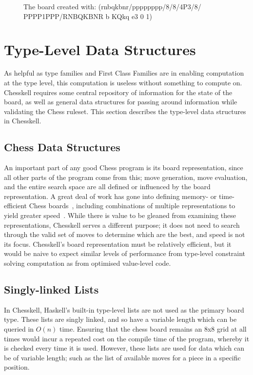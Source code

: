 \begin{figure}[h]
    \centering
    \showboard
    \caption{The board created with: (rnbqkbnr/pppppppp/8/8/4P3/8/\\PPPP1PPP/RNBQKBNR b KQkq e3 0 1)}
    \label{fenexample}
\end{figure}

\section{Type-Level Data Structures}

As helpful as type families and First Class Families are in enabling computation at the type level, this computation is useless without something to compute on. Chesskell requires some central repository of information for the state of the board, as well as general data structures for passing around information while validating the Chess ruleset. This section describes the type-level data structures in Chesskell.

\subsection{Chess Data Structures}

An important part of any good Chess program is its board representation, since all other parts of the program come from this; move generation, move evaluation, and the entire search space are all defined or influenced by the board representation. A great deal of work has gone into defining memory- or time-efficient Chess boards~\cite{bitboard,searchtables}, including combinations of multiple representations to yield greater speed~\cite{bitandccr}. While there is value to be gleaned from examining these representations, Chesskell serves a different purpose; it does not need to search through the valid set of moves to determine which are the best, and speed is not its focus. Chesskell's board representation must be relatively efficient, but it would be naive to expect similar levels of performance from type-level constraint solving computation as from optimised value-level code.

\subsection{Singly-linked Lists}

In Chesskell, Haskell's built-in type-level lists are not used as the primary board type. These lists are singly linked, and so have a variable length which can be queried in $O(n)$ time. Ensuring that the chess board remains an 8x8 grid at all times would incur a repeated cost on the compile time of the program, whereby it is checked every time it is used. However, these lists are used for data which can be of variable length; such as the list of available moves for a piece in a specific position.


